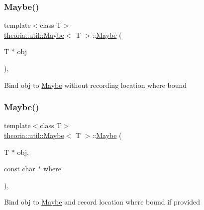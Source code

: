 \subsubsection{\texorpdfstring{Maybe()}{Maybe()}\hspace{0.1cm}{\footnotesize\ttfamily [1/4]}}
{\footnotesize\ttfamily template$<$class T$>$ \\
\hyperlink{classtheoria_1_1util_1_1Maybe}{theoria\+::util\+::\+Maybe}$<$ T $>$\+::\hyperlink{classtheoria_1_1util_1_1Maybe}{Maybe} (\begin{DoxyParamCaption}\item[{T $\ast$}]{obj }\end{DoxyParamCaption})\hspace{0.3cm}{\ttfamily [inline]}, {\ttfamily [explicit]}}

Bind obj to \hyperlink{classtheoria_1_1util_1_1Maybe}{Maybe} without recording location where bound \mbox{\label{classtheoria_1_1util_1_1Maybe_a20f1e97e3620fed19c579ffdc9063bf8}} 
\subsubsection{\texorpdfstring{Maybe()}{Maybe()}\hspace{0.1cm}{\footnotesize\ttfamily [2/4]}}
{\footnotesize\ttfamily template$<$class T$>$ \\
\hyperlink{classtheoria_1_1util_1_1Maybe}{theoria\+::util\+::\+Maybe}$<$ T $>$\+::\hyperlink{classtheoria_1_1util_1_1Maybe}{Maybe} (\begin{DoxyParamCaption}\item[{T $\ast$}]{obj,  }\item[{const char $\ast$}]{where }\end{DoxyParamCaption})\hspace{0.3cm}{\ttfamily [inline]}, {\ttfamily [explicit]}}

Bind obj to \hyperlink{classtheoria_1_1util_1_1Maybe}{Maybe} and record location where bound if provided \mbox{\label{classtheoria_1_1util_1_1Maybe_a077b3ce153debaf6adb797ebf494745b}} 
